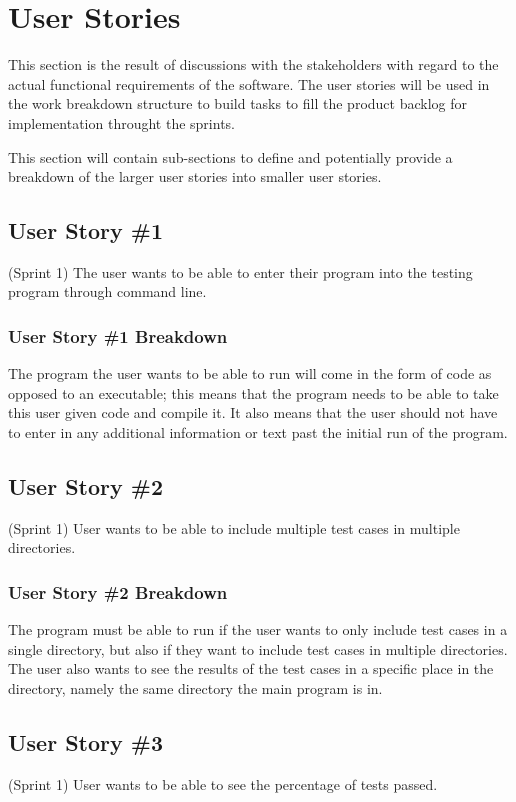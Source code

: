 \section{User Stories}
This section is the result of discussions with the stakeholders with regard to the actual functional requirements of the software. The user stories will be used in the work breakdown structure to build tasks to fill the product backlog for implementation throught the sprints.

This section will contain sub-sections to define and potentially provide a breakdown of the larger user stories into smaller user stories.



\subsection{User Story \#1}
(Sprint 1) The user wants to be able to enter their program into the testing program through command line.

\subsubsection{User Story \#1 Breakdown}
The program the user wants to be able to run will come in the form of code as opposed to an executable; this means that the program needs to be able to take this user given code and compile it. It also means that the user should not have to enter in any additional information or text past the initial run of the program. 

\subsection{User Story \#2} 
(Sprint 1) User wants to be able to include multiple test cases in multiple directories.

\subsubsection{User Story \#2 Breakdown}
The program must be able to run if the user wants to only include test cases in a single directory, but also if they want to include test cases in multiple directories. The user also wants to see the results of the test cases in a specific place in the directory, namely the same directory the main program is in. 

\subsection{User Story \#3} 
(Sprint 1) User wants to be able to see the percentage of tests passed.

